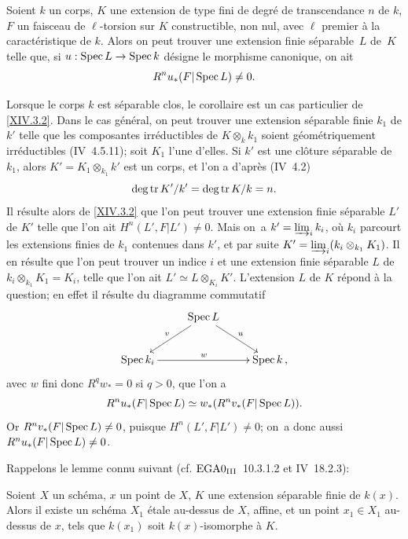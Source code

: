 \begin{corollaire} \label{XIV.3.3}
Soient $k$ un corps, $K$ une extension de type fini de degr\'e de transcendance $n$ de $k$, $F$ un faisceau de $\ell$-torsion sur $K$ constructible, non nul, avec $\ell$ premier \`a la caract\'eristique de $k$. Alors on peut trouver une extension finie s\'eparable~$L$ de~$K$ telle que, si $u: \Spec L \to \Spec k$ d\'esigne le morphisme canonique, on ait
$$R^n u_*(F{|\operatorname{Spec} L}) \neq 0.
$$
\end{corollaire}

Lorsque le corps $k$ est s\'eparable clos, le corollaire est un cas particulier de \ref{XIV.3.2}. Dans le cas g\'en\'eral, on peut trouver une extension s\'eparable finie $k_1$ de $k'$ telle que les composantes irr\'eductibles de $K \otimes_k k_1$ soient g\'eom\'etriquement irr\'eductibles (\EGA IV~4.5.11); soit $K_1$ l'une d'elles. Si $k'$ est une cl\^{o}ture s\'eparable de $k_1$, alors $K' = K_1 \otimes_{k_1} k'$ est un corps, et l'on a d'apr\`es (\EGA IV~4.2)
$$
\deg \operatorname{tr} K'/k' = \deg \operatorname{tr} K/k = n.
$$
Il r\'esulte alors de \ref{XIV.3.2} que l'on peut trouver une extension finie s\'eparable $L'$ de $K'$ telle que l'on ait $H^n(L', F{|L'}) \neq 0$. Mais on~a $k' = \varinjlim_i k_i$, o\`u $k_i$ parcourt les extensions finies de $k_1$ contenues dans $k'$, et par suite $K' = \varinjlim_i (k_i \otimes_{k_1} K_1)$. Il en r\'esulte que l'on peut trouver un indice $i$ et une extension finie s\'eparable $L$ de $k_i \otimes_{k_1} K_1 =K_i$, telle que l'on ait $L' \simeq L \otimes_{K_i} K'$. L'extension $L$ de $K$ r\'epond \`a la question; en effet il r\'esulte du diagramme commutatif
$$
\xymatrix{
&{\mathrm{Spec}\,L}\ar[dl]_v\ar[dr]^u&\\
{\mathrm{Spec}\,k_i} \ar[rr]^w &{}&{\mathrm{Spec}\,k\,,}
}
$$
avec $w$ fini donc $R^q w_* = 0$ si $q>0$, que l'on a
$$R^n u_*(F{|\operatorname{Spec} L}) \simeq w_*(R^n v_*(F{|\operatorname{Spec} L})).
$$
Or $R^nv_*(F{|\operatorname{Spec} L}) \neq 0$, puisque $H^n(L', F{|L'}) \neq 0$; on~a donc aussi $R^nu_*(F{|\operatorname{Spec} L}) \neq 0$.

Rappelons le lemme connu suivant (cf. $\textup{EGA}\space 0_{\textup{III}}$~10.3.1.2 et \EGA IV~18.2.3):

\begin{lemme} \label{XIV.3.4}
Soient $X$ un sch\'ema, $x$ un point de $X$, $K$ une extension s\'eparable finie de $k(x)$. Alors il existe un sch\'ema $X_1$ \'etale au-dessus de $X$, affine, et un point $x_1 \in X_1$ au-dessus de $x$, tels que $k(x_1)$ soit $k(x)$-isomorphe \`a $K$.
\end{lemme}

